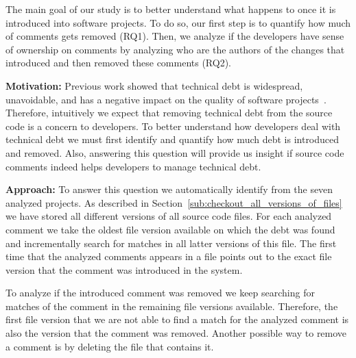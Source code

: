 The main goal of our study is to better understand what happens to \SATD once it is introduced into software projects. To do so, our first step is to quantify how much of \SATD comments gets removed (RQ1). Then, we analyze if the developers have sense of ownership on \SATD comments by analyzing who are the authors of the changes that introduced and then removed these \SATD comments (RQ2). 


\vspace{2mm}
\noindent\rqi

\noindent \textbf{Motivation:} Previous work showed that technical debt is widespread, unavoidable, and has a negative impact on the quality of software projects~\cite{Lim2012Software}. Therefore, intuitively we expect that removing technical debt from the source code is a concern to developers. To better understand how developers deal with technical debt we must first identify and quantify how much debt is introduced and removed. Also, answering this question will provide us insight if source code comments indeed helps developers to manage technical debt. 

\vspace{1mm}
\noindent \textbf{Approach:} To answer this question we automatically identify   from the seven analyzed projects. As described in Section~\ref{sub:checkout_all_versions_of_files} we have stored all different versions of all source code files. For each analyzed \SATD comment we take the oldest file version available on which the debt was found and incrementally search for matches in all latter versions of this file. The first time that the analyzed \SATD comments appears in a file points out to the exact file version that the \SATD comment was introduced in the system.

To analyze if the introduced \SATD comment was removed we keep searching for matches of the comment in the remaining file versions available. Therefore, the first file version that we are not able to find a match for the analyzed comment is also the version that the \SATD comment was removed. Another possible way to remove a \SATD comment is by deleting the file that contains it. 

